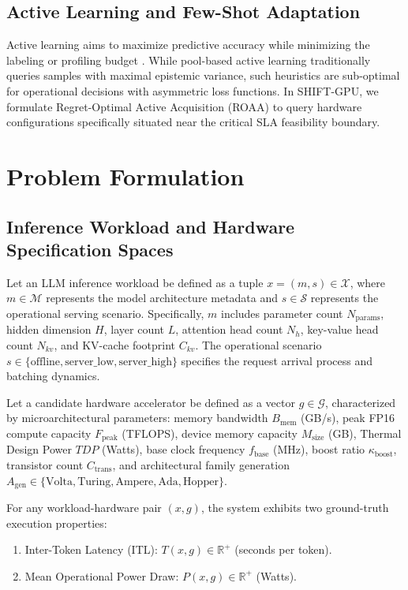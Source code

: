 \documentclass[preprint,12pt]{elsarticle}
\begin{document}
\subsection{Active Learning and Few-Shot Adaptation}
Active learning aims to maximize predictive accuracy while minimizing the labeling or profiling budget \citep{settles2009active}. While pool-based active learning traditionally queries samples with maximal epistemic variance, such heuristics are sub-optimal for operational decisions with asymmetric loss functions. In SHIFT-GPU, we formulate Regret-Optimal Active Acquisition (ROAA) to query hardware configurations specifically situated near the critical SLA feasibility boundary.

\section{Problem Formulation}
\label{sec:formulation}

\subsection{Inference Workload and Hardware Specification Spaces}
Let an LLM inference workload be defined as a tuple $x = (m, s) \in \mathcal{X}$, where $m \in \mathcal{M}$ represents the model architecture metadata and $s \in \mathcal{S}$ represents the operational serving scenario. Specifically, $m$ includes parameter count $N_{\text{params}}$, hidden dimension $H$, layer count $L$, attention head count $N_h$, key-value head count $N_{kv}$, and KV-cache footprint $C_{kv}$. The operational scenario $s \in \{\text{offline}, \text{server\_low}, \text{server\_high}\}$ specifies the request arrival process and batching dynamics.

Let a candidate hardware accelerator be defined as a vector $g \in \mathcal{G}$, characterized by microarchitectural parameters: memory bandwidth $B_{\text{mem}}$ (GB/s), peak FP16 compute capacity $F_{\text{peak}}$ (TFLOPS), device memory capacity $M_{\text{size}}$ (GB), Thermal Design Power $TDP$ (Watts), base clock frequency $f_{\text{base}}$ (MHz), boost ratio $\kappa_{\text{boost}}$, transistor count $C_{\text{trans}}$, and architectural family generation $A_{\text{gen}} \in \{\text{Volta}, \text{Turing}, \text{Ampere}, \text{Ada}, \text{Hopper}\}$.

For any workload-hardware pair $(x, g)$, the system exhibits two ground-truth execution properties:
\begin{enumerate}
    \item Inter-Token Latency (ITL): $T(x, g) \in \mathbb{R}^+$ (seconds per token).
    \item Mean Operational Power Draw: $P(x, g) \in \mathbb{R}^+$ (Watts).
\end{enumerate}
\end{document}
